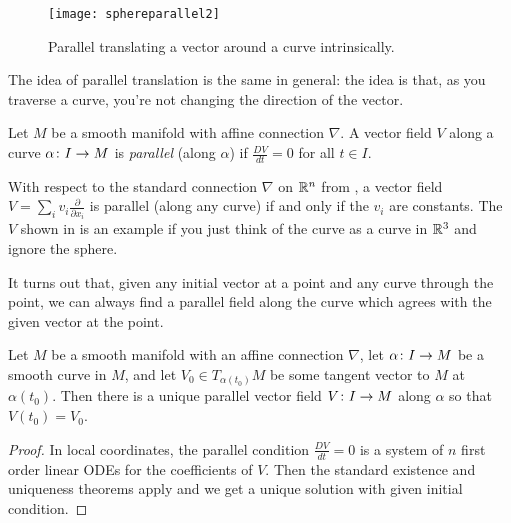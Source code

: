 \begin{example}
	\begin{figure}[htbp]
		\centering
			\texttt{[image: sphereparallel2]}
		\caption{Parallel translating a vector around a curve intrinsically.}
		\label{fig:sphereparallel2}
	\end{figure}
\end{example}

The idea of parallel translation is the same in general: the idea is that, as you traverse a curve, you're not changing the direction of the vector.

\begin{definition}\label{def:parallel vector field}
	Let $M$ be a smooth manifold with affine connection $\nabla$. A vector field $V$ along a curve $\alpha \colon\thinspace\! I \to M$ is \emph{parallel} (along $\alpha$) if $\frac{DV}{dt} = 0$ for all $t \in I$.
\end{definition}

\begin{example}
	With respect to the standard connection $\nabla$ on $\mathbb{R}^n$ from , a vector field $V = \sum_i v_i \frac{\partial}{\partial x_i}$ is parallel (along any curve) if and only if the $v_i$ are constants. The $V$ shown in  is an example if you just think of the curve as a curve in $\mathbb{R}^3$ and ignore the sphere.
\end{example}

It turns out that, given any initial vector at a point and any curve through the point, we can always find a parallel field along the curve which agrees with the given vector at the point.

\begin{proposition}\label{prop:parallel transport}
	Let $M$ be a smooth manifold with an affine connection $\nabla$, let $\alpha \colon\thinspace\! I \to M$ be a smooth curve in $M$, and let $V_0 \in T_{\alpha(t_0)}M$ be some tangent vector to $M$ at $\alpha(t_0)$. Then there is a unique parallel vector field $V \colon\thinspace\! I \to M$ along $\alpha$ so that $V(t_0) = V_0$.
\end{proposition}

\begin{proof}
	In local coordinates, the parallel condition $\frac{DV}{dt} = 0$ is a system of $n$ first order linear ODEs for the coefficients of $V$. Then the standard existence and uniqueness theorems apply and we get a unique solution with given initial condition.
\end{proof}

